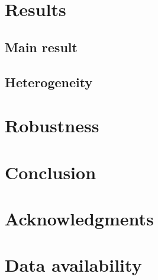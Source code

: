 \documentclass[12pt]{article}
\begin{document}
\section{Results}
\label{sec:results}

\subsection{Main result}
% 

\subsection{Heterogeneity}
% 

\section{Robustness}
\label{sec:robust}
% 

\section{Conclusion}
\label{sec:conclusion}

\section*{Acknowledgments}

\section*{Data availability}


\end{document}
